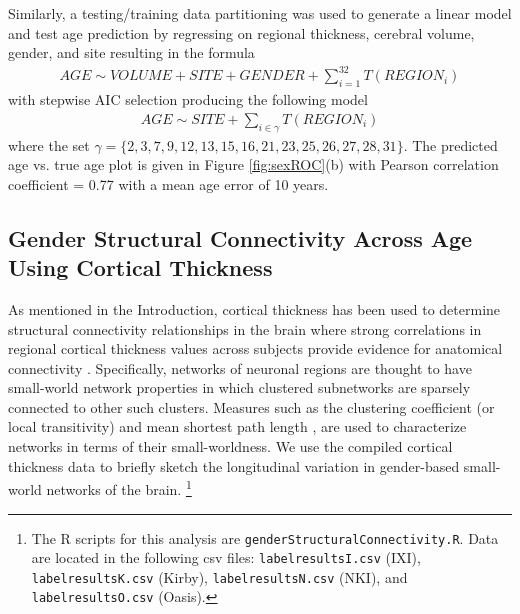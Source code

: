 Similarly, a testing/training data partitioning was used to generate a linear model 
and test age prediction by regressing on regional thickness,
cerebral volume, gender, and site resulting in the formula
\begin{align}
  AGE \sim VOLUME + SITE + GENDER + \sum_{i=1}^{32} T(REGION_{i})
\end{align}
with stepwise AIC selection producing the following model
\begin{align}
  AGE \sim SITE + \sum_{i\in\gamma} T(REGION_{i})
\end{align}
where the set $\gamma = \{2,3,7,9,12,13,15,16, 21,23,25,26,27,28,31\}$.  The predicted age vs. true age plot is given
in Figure \ref{fig:sexROC}(b) with Pearson correlation coefficient = 0.77 with a mean
age error of 10 years.


\subsection{Gender Structural Connectivity Across Age Using Cortical Thickness}


As mentioned in the Introduction, cortical thickness has
been used to determine structural connectivity relationships in the brain 
where strong correlations in regional cortical 
thickness values across subjects provide evidence for anatomical
connectivity \citep{he2007,chen2008,he2008}.  Specifically, networks of neuronal
regions are thought to have small-world network properties \citep{sporns2004} 
in which clustered subnetworks are sparsely connected to other such clusters.
Measures such as the
clustering coefficient (or local transitivity) and mean shortest path length
\citep{watts1998}, are used to characterize networks in terms of their 
small-worldness.
We use the compiled cortical thickness data to briefly sketch
the longitudinal variation in gender-based small-world networks of the
brain.%
\footnote{
The R scripts for this analysis are {\tt genderStructuralConnectivity.R}.  Data are located in the following csv files: 
{\tt labelresultsI.csv} (IXI), 
{\tt labelresultsK.csv} (Kirby),
{\tt labelresultsN.csv} (NKI), and
{\tt labelresultsO.csv} (Oasis).
}

